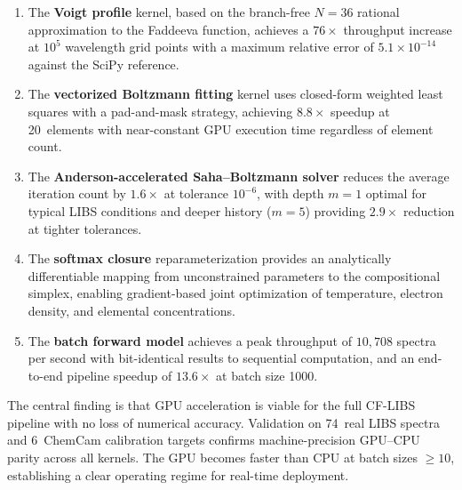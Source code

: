 \documentclass[preprint,12pt,authoryear]{elsarticle}
\begin{document}
\begin{enumerate}
  \item The \textbf{Voigt profile} kernel, based on the branch-free \citet{Weideman1994} $N\!=\!36$ rational approximation to the Faddeeva function, achieves a $76\times$ throughput increase at $10^5$ wavelength grid points with a maximum relative error of $5.1 \times 10^{-14}$ against the SciPy reference.

  \item The \textbf{vectorized Boltzmann fitting} kernel uses closed-form weighted least squares with a pad-and-mask strategy, achieving $8.8\times$ speedup at 20~elements with near-constant GPU execution time regardless of element count.

  \item The \textbf{Anderson-accelerated Saha--Boltzmann solver} reduces the average iteration count by $1.6\times$ at tolerance $10^{-6}$, with depth $m = 1$ optimal for typical LIBS conditions and deeper history ($m = 5$) providing $2.9\times$ reduction at tighter tolerances.

  \item The \textbf{softmax closure} reparameterization provides an analytically differentiable mapping from unconstrained parameters to the compositional simplex, enabling gradient-based joint optimization of temperature, electron density, and elemental concentrations.

  \item The \textbf{batch forward model} achieves a peak throughput of $10{,}708$ spectra per second with bit-identical results to sequential computation, and an end-to-end pipeline speedup of $13.6\times$ at batch size 1000.
\end{enumerate}

The central finding is that GPU acceleration is viable for the full CF-LIBS pipeline with no loss of numerical accuracy.
Validation on 74~real LIBS spectra and 6~ChemCam calibration targets confirms machine-precision GPU--CPU parity across all kernels.
The GPU becomes faster than CPU at batch sizes $\geq 10$, establishing a clear operating regime for real-time deployment.
\end{document}
